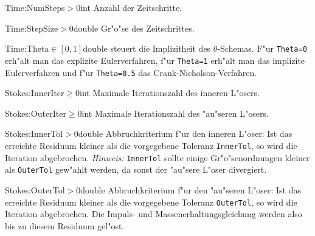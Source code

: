 \begin{Desc}
{Time:NumSteps}{$>0$}{int}
    Anzahl der Zeitschritte.
\end{Desc}
%
\begin{Desc}
{Time:StepSize}{$>0$}{double}
Gr"o"se des Zeitschrittes.
\end{Desc}
%
\begin{Desc}
{Time:Theta}{$\in[0,1]$}{double}
steuert die Implizitheit des $\theta$-Schemas. F"ur
\verb|Theta=0| erh"alt man das explizite Eulerverfahren, f"ur
\verb|Theta=1| erh"alt man das implizite Eulerverfahren und f"ur
\verb|Theta=0.5| das Crank-Nicholson-Verfahren.
\end{Desc}


\begin{Desc}
{Stokes:InnerIter}{$\geq0$}{int}
Maximale Iterationszahl des inneren L"osers. 
\end{Desc}
%
\begin{Desc}
{Stokes:OuterIter}{$\geq0$}{int}
Maximale Iterationszahl des "au"seren L"osers.
\end{Desc}
%
\begin{Desc}
{Stokes:InnerTol}{$>0$}{double}
Abbruchkriterium f"ur den inneren L"oser: Ist das erreichte Residuum kleiner als
die vorgegebene Toleranz \verb|InnerTol|, so wird die Iteration abgebrochen.
\emph{Hinweis:} \verb|InnerTol| sollte einige Gr"o"senordnungen kleiner als
\verb|OuterTol| gew"ahlt werden, da sonst der "au"sere L"oser divergiert.
\end{Desc}
%
\begin{Desc}
{Stokes:OuterTol}{$>0$}{double}
Abbruchkriterium f"ur den "au"seren L"oser: Ist das erreichte Residuum kleiner 
als die vorgegebene Toleranz \verb|OuterTol|, so wird die Iteration abgebrochen.
Die Impuls- und Massenerhaltungsgleichung werden also bis zu diesem Residuum
gel"ost.
\end{Desc}


